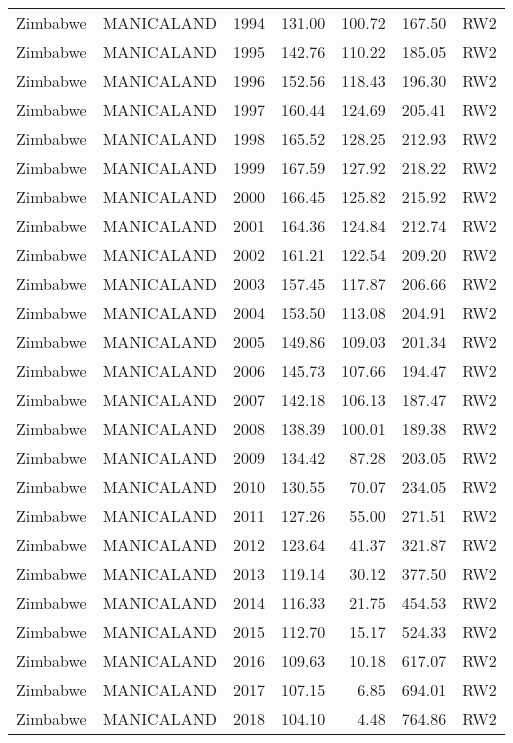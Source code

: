 \begin{longtable}{lllrrrl}
  Zimbabwe & MANICALAND & 1994 & 131.00 & 100.72 & 167.50 & RW2 \\ 
  Zimbabwe & MANICALAND & 1995 & 142.76 & 110.22 & 185.05 & RW2 \\ 
  Zimbabwe & MANICALAND & 1996 & 152.56 & 118.43 & 196.30 & RW2 \\ 
  Zimbabwe & MANICALAND & 1997 & 160.44 & 124.69 & 205.41 & RW2 \\ 
  Zimbabwe & MANICALAND & 1998 & 165.52 & 128.25 & 212.93 & RW2 \\ 
  Zimbabwe & MANICALAND & 1999 & 167.59 & 127.92 & 218.22 & RW2 \\ 
  Zimbabwe & MANICALAND & 2000 & 166.45 & 125.82 & 215.92 & RW2 \\ 
  Zimbabwe & MANICALAND & 2001 & 164.36 & 124.84 & 212.74 & RW2 \\ 
  Zimbabwe & MANICALAND & 2002 & 161.21 & 122.54 & 209.20 & RW2 \\ 
  Zimbabwe & MANICALAND & 2003 & 157.45 & 117.87 & 206.66 & RW2 \\ 
  Zimbabwe & MANICALAND & 2004 & 153.50 & 113.08 & 204.91 & RW2 \\ 
  Zimbabwe & MANICALAND & 2005 & 149.86 & 109.03 & 201.34 & RW2 \\ 
  Zimbabwe & MANICALAND & 2006 & 145.73 & 107.66 & 194.47 & RW2 \\ 
  Zimbabwe & MANICALAND & 2007 & 142.18 & 106.13 & 187.47 & RW2 \\ 
  Zimbabwe & MANICALAND & 2008 & 138.39 & 100.01 & 189.38 & RW2 \\ 
  Zimbabwe & MANICALAND & 2009 & 134.42 & 87.28 & 203.05 & RW2 \\ 
  Zimbabwe & MANICALAND & 2010 & 130.55 & 70.07 & 234.05 & RW2 \\ 
  Zimbabwe & MANICALAND & 2011 & 127.26 & 55.00 & 271.51 & RW2 \\ 
  Zimbabwe & MANICALAND & 2012 & 123.64 & 41.37 & 321.87 & RW2 \\ 
  Zimbabwe & MANICALAND & 2013 & 119.14 & 30.12 & 377.50 & RW2 \\ 
  Zimbabwe & MANICALAND & 2014 & 116.33 & 21.75 & 454.53 & RW2 \\ 
  Zimbabwe & MANICALAND & 2015 & 112.70 & 15.17 & 524.33 & RW2 \\ 
  Zimbabwe & MANICALAND & 2016 & 109.63 & 10.18 & 617.07 & RW2 \\ 
  Zimbabwe & MANICALAND & 2017 & 107.15 & 6.85 & 694.01 & RW2 \\ 
  Zimbabwe & MANICALAND & 2018 & 104.10 & 4.48 & 764.86 & RW2 \\ 

\end{longtable}
